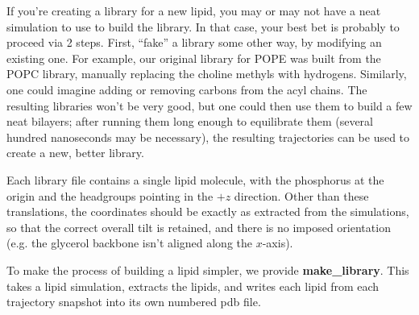 \documentclass[12pt]{article}
\begin{document}
If you're creating a library for a new lipid, you may or may not have a neat
simulation to use to build the library.  In that case, your best bet is
probably to proceed via 2 steps.  First, ``fake'' a library some other way,
by modifying an existing one.  For example, our original library for POPE was
built from the POPC library, manually replacing the choline methyls with
hydrogens.  Similarly, one could imagine adding or removing carbons from the
acyl chains.  The resulting libraries won't be very good, but one could then
use them to build a few neat bilayers; after running them long enough to
equilibrate them (several hundred nanoseconds may be necessary), the
resulting trajectories can be used to create a new, better library.

Each library file contains a single lipid molecule, with the phosphorus at
the origin and the headgroups pointing in the $+z$ direction.  Other than
these translations, the coordinates should be exactly as extracted from the
simulations, so that the correct overall tilt is retained, and there is no
imposed orientation (e.g. the glycerol backbone isn't aligned along the
$x$-axis).

To make the process of building a lipid simpler, we provide {\bf
make\_library}.  This takes a lipid simulation, extracts the lipids, and
writes each lipid from each trajectory snapshot into its own numbered pdb file.
\end{document}
